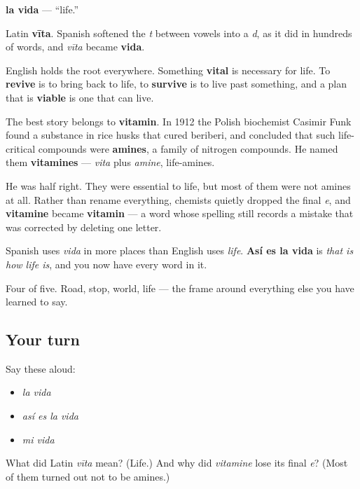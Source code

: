 \begin{cousinweb}
\textbf{la vida} — \textquotedblleft{}life.\textquotedblright{}

Latin \textbf{vīta}. Spanish softened the \emph{t} between vowels into a \emph{d}, as it did in hundreds of words, and \emph{vīta} became \textbf{vida}.

English holds the root everywhere. Something \textbf{vital} is necessary for life. To \textbf{revive} is to bring back to life, to \textbf{survive} is to live past something, and a plan that is \textbf{viable} is one that can live.

The best story belongs to \textbf{vitamin}. In 1912 the Polish biochemist Casimir Funk found a substance in rice husks that cured beriberi, and concluded that such life-critical compounds were \textbf{amines}, a family of nitrogen compounds. He named them \textbf{vitamines} — \emph{vita} plus \emph{amine}, life-amines.

He was half right. They were essential to life, but most of them were not amines at all. Rather than rename everything, chemists quietly dropped the final \emph{e}, and \textbf{vitamine} became \textbf{vitamin} — a word whose spelling still records a mistake that was corrected by deleting one letter.

Spanish uses \emph{vida} in more places than English uses \emph{life}. \textbf{Así es la vida} is \emph{that is how life is}, and you now have every word in it.
\end{cousinweb}

\begin{grammarlens}[title={What you've built}]
Four of five. Road, stop, world, life — the frame around everything else you have learned to say.
\end{grammarlens}

\subsection*{Your turn}
Say these aloud:

\begin{itemize}
\raggedright
  \item \emph{la vida}
  \item \emph{así es la vida}
  \item \emph{mi vida}
\end{itemize}

\begin{tcolorbox}[breakable,colback=teal!4,colframe=teal!35!black,title={Before you move on}]
What did Latin \emph{vīta} mean? (Life.) And why did \emph{vitamine} lose its final \emph{e}? (Most of them turned out not to be amines.)
\end{tcolorbox}
